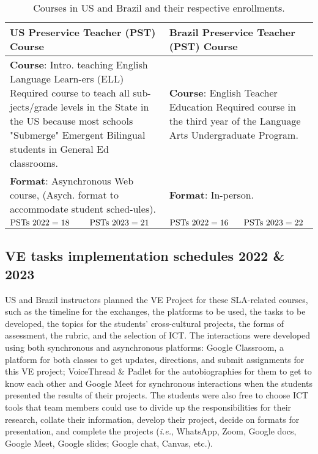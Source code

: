 \begin{table}[htpb]
\centering
\begin{threeparttable}
\caption{Courses in US and Brazil and their respective enrollments.}
\label{tab-01}
\small
\setlength{\tabcolsep}{3pt}
\begin{tabular}{*{4}{p{}}}
\toprule
\multicolumn{2}{p{0.46\textwidth}}{US Preservice Teacher (PST) Course} & \multicolumn{2}{p{0.46\textwidth}}{Brazil Preservice Teacher (PST) Course} \\
\midrule    
\multicolumn{2}{p{0.5\textwidth}}{\textbf{Course}: Intro. teaching English Language Learn-ers (ELL)
\newline *Required course to teach all sub-jects/grade levels in the State in the US because most schools "Submerge" Emergent Bilingual students in General Ed classrooms.
} & 
\multicolumn{2}{p{0.5\textwidth}}{\textbf{Course}: English Teacher Education
\newline *Required course in the third year of the Language Arts Undergraduate Program.}
\\

\multicolumn{2}{p{0.5\textwidth}}{\textbf{Format}: Asynchronous Web course, (Asych. format to accommodate student sched-ules).} & \multicolumn{2}{p{0.5\textwidth}}{\textbf{Format}: In-person.}
\\
				
$\textmd{PSTs 2022} = 18$ & $\textmd{PSTs  2023} = 21$	& $\textmd{PSTs  2022} = 16$ & $\textmd{PSTs  2023} = 22$ \\
\bottomrule
\end{tabular}
\end{threeparttable}
\end{table}
		
\subsection{VE tasks implementation schedules 2022 \& 2023}\label{sub-sec-vetasksimplementation}
	
US and Brazil instructors planned the VE Project for these SLA-related
courses, such as the timeline for the exchanges, the platforms to be
used, the tasks to be developed, the topics for the students'
cross-cultural projects, the forms of assessment, the rubric, and the
selection of ICT. The interactions were developed using both synchronous
and asynchronous platforms: Google Classroom, a platform for both
classes to get updates, directions, and submit assignments for this VE
project; VoiceThread \& Padlet for the autobiographies for them to get
to know each other and Google Meet for synchronous interactions when the
students presented the results of their projects. The students were also
free to choose ICT tools that team members could use to divide up the
responsibilities for their research, collate their information, develop
their project, decide on formats for presentation, and complete the
projects (\emph{i.e.}, WhatsApp, Zoom, Google docs, Google Meet, Google
slides; Google chat, Canvas, etc.).
	
